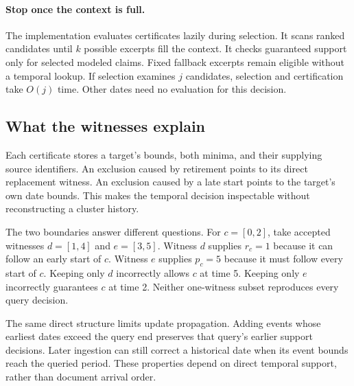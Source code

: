 \paragraph{Stop once the context is full.}
The implementation evaluates certificates lazily during selection.
It scans ranked candidates until $k$ possible excerpts fill the context.
It checks guaranteed support only for selected modeled claims.
Fixed fallback excerpts remain eligible without a temporal lookup.
If selection examines $j$ candidates, selection and certification take $O(j)$ time.
Other dates need no evaluation for this decision.



\subsection{What the witnesses explain}

Each certificate stores a target's bounds, both minima, and their supplying source identifiers.
An exclusion caused by retirement points to its direct replacement witness.
An exclusion caused by a late start points to the target's own date bounds.
This makes the temporal decision inspectable without reconstructing a cluster history.

The two boundaries answer different questions.
For $c=[0,2]$, take accepted witnesses $d=[1,4]$ and $e=[3,5]$.
Witness $d$ supplies $r_c=1$ because it can follow an early start of $c$.
Witness $e$ supplies $p_c=5$ because it must follow every start of $c$.
Keeping only $d$ incorrectly allows $c$ at time 5.
Keeping only $e$ incorrectly guarantees $c$ at time 2.
Neither one-witness subset reproduces every query decision.

The same direct structure limits update propagation.
Adding events whose earliest dates exceed the query end preserves that query's earlier support decisions.
Later ingestion can still correct a historical date when its event bounds reach the queried period.
These properties depend on direct temporal support, rather than document arrival order.
